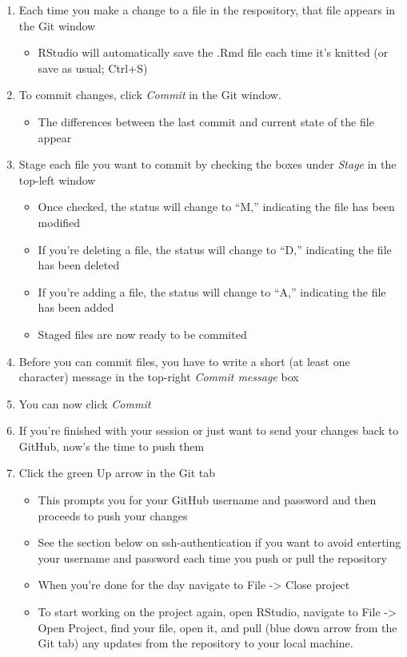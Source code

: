 \documentclass[12pt,]{article}
\providecommand{\tightlist}{%
  \setlength{\itemsep}{0pt}\setlength{\parskip}{0pt}}
\begin{document}
\begin{enumerate}
\def\labelenumi{\arabic{enumi}.}
\item
  Each time you make a change to a file in the respository, that file
  appears in the Git window

  \begin{itemize}
  \tightlist
  \item
    RStudio will automatically save the .Rmd file each time it's knitted
    (or save as usual; Ctrl+S)
  \end{itemize}
\item
  To commit changes, click \emph{Commit} in the Git window.

  \begin{itemize}
  \tightlist
  \item
    The differences between the last commit and current state of the
    file appear
  \end{itemize}
\item
  Stage each file you want to commit by checking the boxes under
  \emph{Stage} in the top-left window

  \begin{itemize}
  \tightlist
  \item
    Once checked, the status will change to ``M,'' indicating the file
    has been modified
  \item
    If you're deleting a file, the status will change to ``D,''
    indicating the file has been deleted
  \item
    If you're adding a file, the status will change to ``A,'' indicating
    the file has been added
  \item
    Staged files are now ready to be commited
  \end{itemize}
\item
  Before you can commit files, you have to write a short (at least one
  character) message in the top-right \emph{Commit message} box
\item
  You can now click \emph{Commit}
\item
  If you're finished with your session or just want to send your changes
  back to GitHub, now's the time to push them
\item
  Click the green Up arrow in the Git tab

  \begin{itemize}
  \tightlist
  \item
    This prompts you for your GitHub username and password and then
    proceeds to push your changes
  \item
    See the section below on ssh-authentication if you want to avoid
    enterting your username and password each time you push or pull the
    repository
  \item
    When you're done for the day navigate to File -\textgreater{} Close
    project
  \item
    To start working on the project again, open RStudio, navigate to
    File -\textgreater{} Open Project, find your file, open it, and pull
    (blue down arrow from the Git tab) any updates from the repository
    to your local machine.
  \end{itemize}
\end{enumerate}
\end{document}
